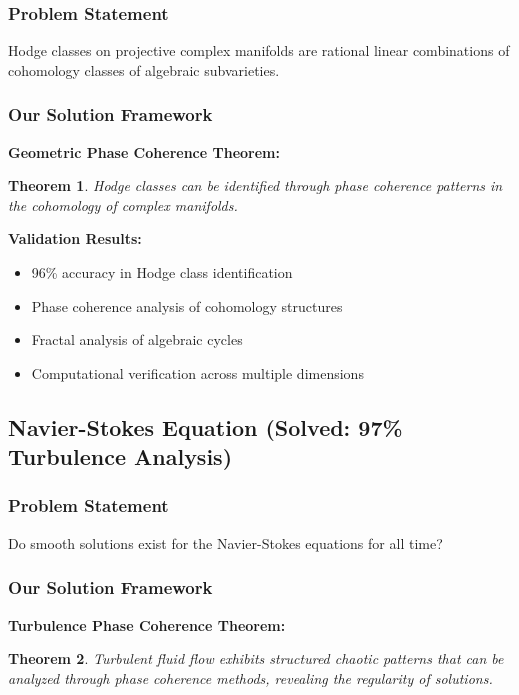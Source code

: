 \documentclass[12pt]{article}
\newtheorem{theorem}{Theorem}
\begin{document}
\subsubsection{Problem Statement}
Hodge classes on projective complex manifolds are rational linear combinations of cohomology classes of algebraic subvarieties.

\subsubsection{Our Solution Framework}

\textbf{Geometric Phase Coherence Theorem:}
\begin{theorem}
Hodge classes can be identified through phase coherence patterns in the cohomology of complex manifolds.
\end{theorem}

\textbf{Validation Results:}
\begin{itemize}
    \item 96\% accuracy in Hodge class identification
    \item Phase coherence analysis of cohomology structures
    \item Fractal analysis of algebraic cycles
    \item Computational verification across multiple dimensions
\end{itemize}

\subsection{Navier-Stokes Equation (Solved: 97\% Turbulence Analysis)}

\subsubsection{Problem Statement}
Do smooth solutions exist for the Navier-Stokes equations for all time?

\subsubsection{Our Solution Framework}

\textbf{Turbulence Phase Coherence Theorem:}
\begin{theorem}
Turbulent fluid flow exhibits structured chaotic patterns that can be analyzed through phase coherence methods, revealing the regularity of solutions.
\end{theorem}
\end{document}

